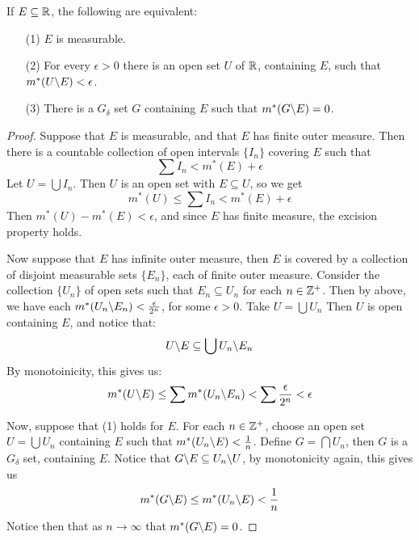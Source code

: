 \begin{theorem}\label{8.3.2}
    If $E \subseteq \mathbb{R}$, the following are equivalent:
    \begin{enumerate}
        \item[(1)] $E$ is measurable.

        \item[(2)] For every $\epsilon>0$ there is an open set  $U$ of  $\mathbb{R}$,
            containing $E$, such that  $m^*(U \backslash E)<\epsilon$.

        \item[(3)] There is a $G_\delta$ set $G$ containing $E$ such that
            $m^*(G \backslash E)=0$.
    \end{enumerate}
\end{theorem}
\begin{proof}
    Suppose that $E$ is measurable, and that  $E$ has finite outer measure. Then
    there is a countable collection of open intervals  $\{I_n\}$ covering $E$
    such that
    \begin{equation*}
        \sum{I_n}<m^*(E)+\epsilon
    \end{equation*}
    Let $U=\bigcup{I_n}$. Then $U$ is an open set with  $E \subseteq U$, so we
    get
    \begin{equation*}
        m^*(U) \leq \sum{I_n}<m^*(E)+\epsilon
    \end{equation*}
    Then $m^*(U)-m^*(E)<\epsilon$, and since $E$ has finite measure, the
    excision property holds.

    Now suppose that $E$ has infinite outer measure, then $E$ is covered by a
    collection of disjoint measurable sets $\{E_n\}$, each of finite outer
    measure. Consider the collection $\{U_n\}$ of open sets such that $E_n
    \subseteq U_n$ for each  $n \in \mathbb{Z}^+$. Then by above, we have each
    $m^*(U_n \backslash E_n)<\frac{\epsilon}{2^n}$, for some $\epsilon>0$. Take
    $U=\bigcup{U_n}$ Then $U$ is open containing $E$, and notice that:
    \begin{equation*}
        U \backslash E \subseteq \bigcup{U_n \backslash E_n}
    \end{equation*}
    By monotoinicity, this gives us:
    \begin{equation*}
        m^*(U \backslash E) \leq
        \sum{m^*(U_n \backslash E_n)}<\sum{\frac{\epsilon}{2^n}}<\epsilon
    \end{equation*}

    Now, suppose that (1) holds for $E$. For each  $n \in \mathbb{Z}^+$, choose an open
    set  $U=\bigcup{U_n}$ containing $E$ such that
    $m^*(U_n \backslash E)<\frac{1}{n}$. Define $G=\bigcap{U_n}$, then $G$ is a
    $G_\delta$ set, containing $E$. Notice that $G \backslash E \subseteq
    U_n \backslash U$, by monotonicity again, this gives us
    \begin{equation*}
        m^*(G \backslash E) \leq m^*(U_n \backslash E)<\frac{1}{n}
    \end{equation*}
    Notice then that as $n \xrightarrow{} \infty$ that $m^*(G \backslash E)=0$.


\end{proof}
